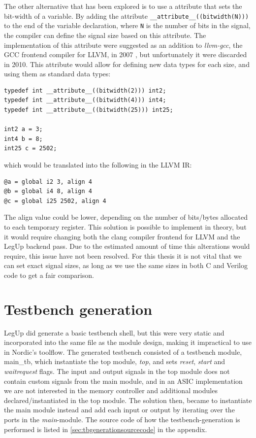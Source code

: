 The other alternative that has been explored is to use a attribute that sets the bit-width of a variable. By adding the attribute \verb!__attribute__((bitwidth(N)))! to the end of the variable declaration, where \verb!N! is the number of bits in the signal, the compiler can define the signal size based on this attribute. The implementation of this attribute were suggested as an addition to \textit{llvm-gcc}, the GCC frontend compiler for LLVM, in 2007 \cite{bitwidthattr}, but unfortunately it were discarded in 2010. This attribute would allow for defining new data types for each size, and using them as standard data types:
\begin{lstlisting}
typedef int __attribute__((bitwidth(2))) int2;
typedef int __attribute__((bitwidth(4))) int4;
typedef int __attribute__((bitwidth(25))) int25;

int2 a = 3;
int4 b = 8;
int25 c = 2502;
\end{lstlisting}
which would be translated into the following in the LLVM IR:
\begin{lstlisting}
@a = global i2 3, align 4
@b = global i4 8, align 4
@c = global i25 2502, align 4
\end{lstlisting}
The align value could be lower, depending on the number of bits/bytes allocated to each temporary register. This solution is possible to implement in theory, but it would require changing both the clang compiler frontend for LLVM and the LegUp backend pass. Due to the estimated amount of time this alterations would require, this issue have not been resolved. For this thesis it is not vital that we can set exact signal sizes, as long as we use the same sizes in both C and Verilog code to get a fair comparison.

\section{\label{subsec:tbgen}Testbench generation}
LegUp did generate a basic testbench shell, but this were very static and incorporated into the same file as the module design, making it impractical to use in Nordic's toolflow. The generated testbench consisted of a testbench module, main\_tb, which instantiate the top module, \textit{top}, and sets \textit{reset}, \textit{start} and \textit{waitrequest} flags. The input and output signals in the top module does not contain custom signals from the main module, and in an ASIC implementation we are not interested in the memory controller and additional modules declared/instantiated in the top module. The solution then, became to instantiate the main module instead and add each input or output by iterating over the ports in the \textit{main}-module. The source code of how the testbench-generation is performed is listed in \cref{sec:tbgenerationsourcecode} in the appendix.

